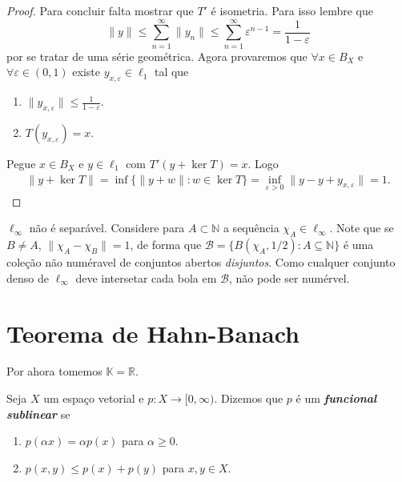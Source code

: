 \documentclass[portuguese]{article}
\theoremstyle{definition}
\newcommand{\R}{\mathbb{R}}
\newcommand{\N}{\mathbb{N}}
\begin{document}
\begin{proof}
		Para concluir falta mostrar que $T'$ é isometria. Para isso lembre que
		\[\| y\|\leq\sum_{n=1}^\infty\| y_n\|\leq\sum_{n=1}^\infty\varepsilon^{n-1}=\frac{1}{1-\varepsilon}\]
		por se tratar de uma série geométrica.
		Agora provaremos que $\forall x\in B_X$ e $\forall\varepsilon\in(0,1)$ existe $y_{x,\varepsilon}\in\ell_1$ tal que
		\begin{enumerate}
			\item $\| y_{x,\varepsilon}\|\leq\frac{1}{1-\varepsilon}$.
			\item $T(y_{x,\varepsilon})=x$.
		\end{enumerate}
		Pegue $x\in B_X$ e $y\in\ell_1$ com $T'(y+\ker T)=x$. Logo
		\begin{align*}
			\| y+\ker T\|=\inf\{\| y+w\|:w\in \ker T\}=\inf_{\varepsilon>0}\| y-y+y_{x,\varepsilon}\|=1.
		\end{align*}
	\end{proof}
	
	\begin{obs}
		$\ell_\infty$ não é separável. Considere para $A\subset\N$ a sequência $\chi_A\in \ell_\infty$. Note que se $B\neq A$, $\| \chi_A-\chi_B\|=1$, de forma que $\mathcal{B}=\{B(\chi_A,1/2):A\subseteq\N\}$ é uma coleção não numéravel de conjuntos abertos \textit{disjuntos}. Como cualquer conjunto denso de $\ell_\infty$ deve intersetar cada bola em $\mathcal{B}$, não pode ser numérvel.
	\end{obs}
	
	
	\section{Teorema de Hahn-Banach}
	Por ahora tomemos $\mathbb{K}=\R$.
	\begin{defn}
		Seja $X$ um espaço vetorial e $p:X\to[0,\infty)$. Dizemos que $p$ é um \textbf{\textit{funcional sublinear}} se
		\begin{enumerate}
			\item $p(\alpha x)=\alpha p(x)$ para $\alpha\geq0$.
			\item $p(x,y)\leq p(x)+p(y)$ para $x,y\in X$.
		\end{enumerate}
	\end{defn}
	
\end{document}
